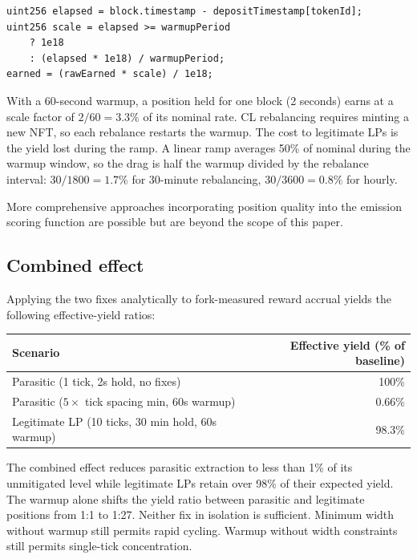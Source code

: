 \documentclass[11pt,a4paper]{article}
\theoremstyle{definition}
\begin{document}
\begin{center}\begin{minipage}{0.85\textwidth}\begin{verbatim}
uint256 elapsed = block.timestamp - depositTimestamp[tokenId];
uint256 scale = elapsed >= warmupPeriod
    ? 1e18
    : (elapsed * 1e18) / warmupPeriod;
earned = (rawEarned * scale) / 1e18;
\end{verbatim}\end{minipage}\end{center}


With a 60-second warmup, a position held for one block (2 seconds) earns at a scale factor of $2/60 = 3.3\%$ of its nominal rate. CL rebalancing requires minting a new NFT, so each rebalance restarts the warmup. The cost to legitimate LPs is the yield lost during the ramp. A linear ramp averages 50\% of nominal during the warmup window, so the drag is half the warmup divided by the rebalance interval: $30/1800 = 1.7\%$ for 30-minute rebalancing, $30/3600 = 0.8\%$ for hourly.

More comprehensive approaches incorporating position quality into the emission scoring function are possible but are beyond the scope of this paper.

\subsection{Combined effect}\label{sec:combined}

Applying the two fixes analytically to fork-measured reward accrual yields the following effective-yield ratios:

\begin{table}[H]
\centering
\begin{tabular}{@{}lr@{}}
\toprule
Scenario & Effective yield (\% of baseline) \\
\midrule
Parasitic (1 tick, 2s hold, no fixes) & 100\% \\
Parasitic ($5\times$ tick spacing min, 60s warmup) & 0.66\% \\
Legitimate LP (10 ticks, 30 min hold, 60s warmup) & 98.3\% \\
\bottomrule
\end{tabular}
\end{table}

The combined effect reduces parasitic extraction to less than 1\% of its unmitigated level while legitimate LPs retain over 98\% of their expected yield. The warmup alone shifts the yield ratio between parasitic and legitimate positions from 1:1 to 1:27. Neither fix in isolation is sufficient. Minimum width without warmup still permits rapid cycling. Warmup without width constraints still permits single-tick concentration.
\end{document}
